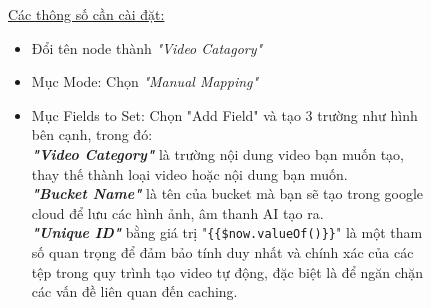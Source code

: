 \begin{figure}[H]
\begin{minipage}{0.4\textwidth}
        \underline{Các thông số cần cài đặt:}\\
        \begin{itemize}[label=\textbullet]
            \item Đổi tên node thành \emph{"Video Catagory"}
            \item Mục Mode: Chọn \emph{"Manual Mapping"}
            \item Mục Fields to Set: Chọn "Add Field" và tạo 3 trường như hình bên cạnh, trong đó:\\
            
            \textbf{\emph{"Video Category"}} là trường  nội dung video bạn muốn tạo, thay thế thành loại video hoặc nội dung bạn muốn.\\
            \textbf{\emph{"Bucket Name"}} là tên của bucket mà bạn sẽ tạo trong google cloud để lưu các hình ảnh, âm thanh AI tạo ra.\\
            \textbf{\emph{"Unique ID"}} bằng giá trị "\verb|{{$now.valueOf()}}|" là một tham số quan trọng để đảm bảo tính duy nhất và chính xác của các tệp trong quy trình tạo video tự động, đặc biệt là để ngăn chặn các vấn đề liên quan đến caching.\\

            
        \end{itemize}
    \end{minipage}
\end{figure}
     


